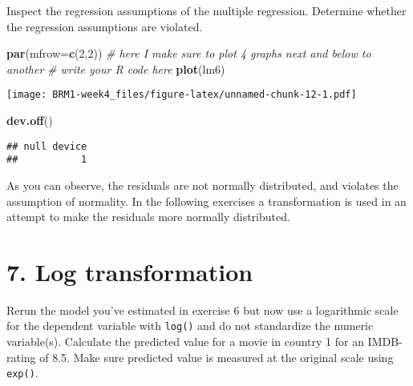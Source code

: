 \documentclass[
]{article}
\newenvironment{Shaded}{\begin{snugshade}}{\end{snugshade}}
\newcommand{\CommentTok}[1]{\textcolor[rgb]{0.56,0.35,0.01}{\textit{#1}}}
\newcommand{\DataTypeTok}[1]{\textcolor[rgb]{0.13,0.29,0.53}{#1}}
\newcommand{\DecValTok}[1]{\textcolor[rgb]{0.00,0.00,0.81}{#1}}
\newcommand{\FloatTok}[1]{\textcolor[rgb]{0.00,0.00,0.81}{#1}}
\newcommand{\KeywordTok}[1]{\textcolor[rgb]{0.13,0.29,0.53}{\textbf{#1}}}
\newcommand{\NormalTok}[1]{#1}
\newcommand{\OperatorTok}[1]{\textcolor[rgb]{0.81,0.36,0.00}{\textbf{#1}}}
\newcommand{\StringTok}[1]{\textcolor[rgb]{0.31,0.60,0.02}{#1}}
\begin{document}
Inspect the regression assumptions of the multiple regression. Determine
whether the regression assumptions are violated.

\begin{Shaded}
\begin{Highlighting}[]
\KeywordTok{par}\NormalTok{(}\DataTypeTok{mfrow=}\KeywordTok{c}\NormalTok{(}\DecValTok{2}\NormalTok{,}\DecValTok{2}\NormalTok{)) }\CommentTok{# here I make sure to plot 4 graphs next and below to another}
\CommentTok{# write your R code here}
\KeywordTok{plot}\NormalTok{(lm6)}
\end{Highlighting}
\end{Shaded}

\texttt{[image: BRM1-week4\_files/figure-latex/unnamed-chunk-12-1.pdf]}

\begin{Shaded}
\begin{Highlighting}[]
\KeywordTok{dev.off}\NormalTok{()}
\end{Highlighting}
\end{Shaded}

\begin{verbatim}
## null device 
##           1
\end{verbatim}

As you can observe, the residuals are not normally distributed, and
violates the assumption of normality. In the following exercises a
transformation is used in an attempt to make the residuals more normally
distributed.

\hypertarget{log-transformation}{%
\section{7. Log transformation}\label{log-transformation}}

Rerun the model you've estimated in exercise 6 but now use a logarithmic
scale for the dependent variable with \texttt{log()} and do not
standardize the numeric variable(s). Calculate the predicted value for a
movie in country 1 for an IMDB-rating of 8.5. Make sure predicted value
is measured at the original scale using \texttt{exp()}.

\begin{Shaded}
\end{Shaded}
\end{document}
